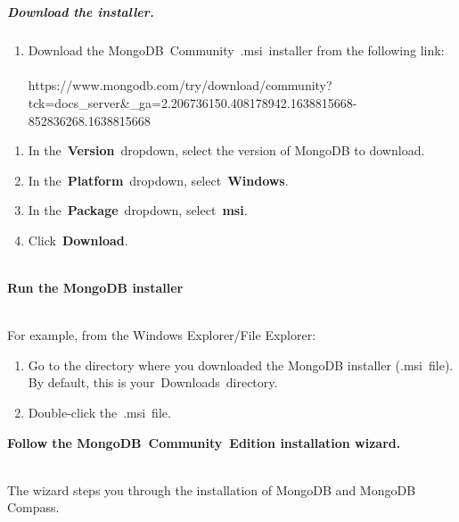 \documentclass{article}
\begin{document}
\noindent 

\noindent 



\noindent \\ \textbf{}

\noindent 

\noindent 
\subparagraph{Download the installer.}

\begin{enumerate}
\item \textbf{ } Download the MongoDB~Community~.msi~installer from the following link:\\ \\ https://www.mongodb.com/try/download/community?tck=docs\_server\&\_ga=2.206736150.408178942.1638815668-852836268.1638815668
\end{enumerate}

\noindent  

\begin{enumerate}
\item  In the~\textbf{Version}~dropdown, select the version of MongoDB to download.

\item  In the~\textbf{Platform}~dropdown, select~\textbf{Windows}.

\item  In the~\textbf{Package}~dropdown, select~\textbf{msi}.

\item  Click~\textbf{Download}.
\end{enumerate}

\noindent 


\noindent \\ \textbf{Run the MongoDB installer}

\noindent \\ For example, from the Windows Explorer/File Explorer:

\begin{enumerate}
\item Go to the directory where you downloaded the MongoDB installer (.msi~file). By default, this is your~Downloads~directory.

\item Double-click the~.msi~file.
\end{enumerate}
\newpage 
\noindent \textbf{Follow the MongoDB~Community~Edition installation wizard.}

\noindent \\ The wizard steps you through the installation of MongoDB and MongoDB Compass.
\end{document}
